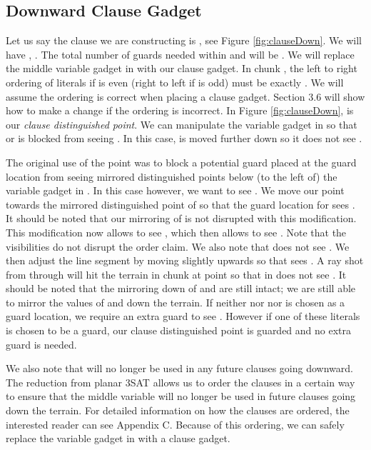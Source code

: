 \documentclass[11pt]{article}
\begin{document}
\subsection{Downward Clause Gadget}

Let us say the clause we are constructing is , see Figure \ref{fig:clauseDown}.  We will have , .  The total number of guards needed within  and  will be .  We will replace the middle variable gadget  in  with our clause gadget.  In chunk , the left to right ordering of literals if  is even (right to left if  is odd) must be exactly .  We will assume the ordering is correct when placing a clause gadget.  Section 3.6 will show how to make a change if the ordering is incorrect.  In Figure \ref{fig:clauseDown},  is our \textit{clause distinguished point}.  We can manipulate the  variable gadget in  so that  or  is blocked from seeing .  In this case,  is moved further down so it does not see .

The original use of the  point was to block a potential guard placed at the  guard location from seeing mirrored distinguished points below (to the left of) the  variable gadget in .  In this case however, we want  to see .  We move our  point towards the mirrored distinguished point of  so that the guard location for  sees .  It should be noted that our mirroring of  is not disrupted with this modification.  This modification now allows  to see , which then allows  to see .  Note that the visibilities do not disrupt the order claim.  We also note that  does not see .  We then adjust the  line segment by moving  slightly upwards so that  sees .  A ray shot from  through  will hit the terrain in chunk  at point  so that  in  does not see .  It should be noted that the mirroring down of  and  are still intact; we are still able to mirror the values of  and  down the terrain.  If neither  nor  nor  is chosen as a guard location, we require an extra guard to see .  However if one of these literals is chosen to be a guard, our clause distinguished point  is guarded and no extra guard is needed.





We also note that  will no longer be used in any future clauses going downward.  The reduction from planar 3SAT allows us to order the clauses in a certain way to ensure that the middle variable will no longer be used in future clauses going down the terrain.  For detailed information on how the clauses are ordered, the interested reader can see Appendix C.  Because of this ordering, we can safely replace the  variable gadget in  with a clause gadget.
\end{document}
